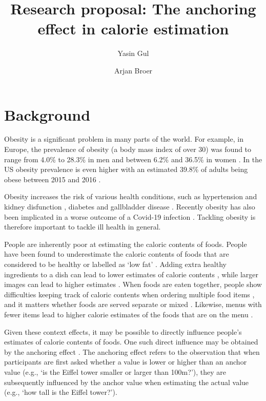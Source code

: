 \documentclass[a4paper,doc,natbib]{apa6}
\title{Research proposal: The anchoring effect in calorie estimation}
\author{Yasin Gul \and Arjan Broer}
\affiliation{Open University of the Netherlands}
\begin{document}
\maketitle

\section{Background}

Obesity is a significant problem in many parts of the world. For example, in Europe, the prevalence of obesity (a body mass index of over 30) was found to range from 4.0\% to 28.3\% in men and between 6.2\% and 36.5\% in women \citep{berghofer2008obesity}. In the US obesity prevalence is even higher with an estimated 39.8\% of adults being obese between 2015 and 2016 \citep{hales2017prevalence}. 

Obesity increases the risk of various health conditions, such as hypertension and kidney disfunction \citep{hall2019obesity}, diabetes \citep{schnurr2020obesity} and gallbladder disease \citep{zahra2019link}. Recently obesity has also been implicated in a worse outcome of a Covid-19 infection \citep{hussain2020obesity}. Tackling obesity is therefore important to tackle ill health in general.

People are inherently poor at estimating the caloric contents of foods. People have been found to underestimate the caloric contents of foods that are considered to be healthy \citep{chandon2007biasing} or labelled as `low fat' \citep{ebneter2013less}. Adding extra healthy ingredients to a dish can lead to lower estimates of calorie contents \citep{zhu2019extra}, while larger images can lead to higher estimates \citep{tal2021visual}. When foods are eaten together, people show difficulties keeping track of caloric contents when ordering multiple food items \citep{gustafson2019cognitive}, and it matters whether foods are served separate or mixed \citep{ai2021serving}. Likewise, menus with fewer items lead to higher calorie estimates of the foods that are on the menu \citep{kim2022impact}.

Given these context effects, it may be possible to directly influence people's estimates of calorie contents of foods. One such direct influence may be obtained by the anchoring effect \citep{furnham2011literature,tversky1974judgment}. The anchoring effect refers to the observation that when participants are first asked whether a value is lower or higher than an anchor value (e.g., `is the Eiffel tower smaller or larger than 100m?'), they are subsequently influenced by the anchor value when estimating the actual value (e.g., `how tall is the Eiffel tower?').
\end{document}
